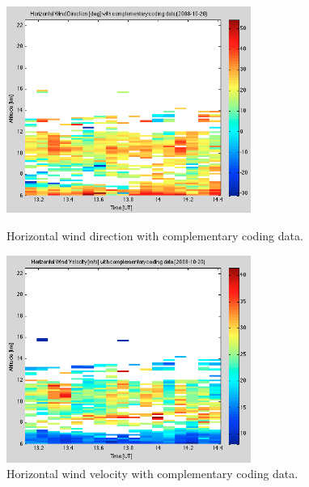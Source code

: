 \documentclass{article}
\begin{document}
\begin{figure}[htb]
\begin{minipage}[t]{0.5\linewidth}
\centering
\includegraphics[width=8cm]{Figures/wind_dir_complementary.png}
\caption{Horizontal wind direction with complementary coding data.}
\label{fig:wind_dir_complementary}
\end{minipage}
\begin{minipage}[t]{0.5\linewidth}
\centering
\includegraphics[width=8cm]{Figures/wind_vel_complementary.png}
\caption{Horizontal wind velocity with complementary coding data.}
\label{fig:wind_vel_complementary}
\end{minipage}
\end{figure}
\end{document}
